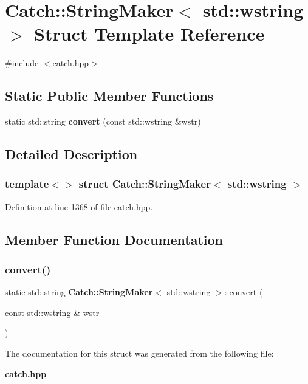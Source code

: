 \section{Catch\+::String\+Maker$<$ std\+::wstring $>$ Struct Template Reference}
\label{struct_catch_1_1_string_maker_3_01std_1_1wstring_01_4}


{\ttfamily \#include $<$catch.\+hpp$>$}

\subsection*{Static Public Member Functions}
\begin{DoxyCompactItemize}
\item 
static std\+::string \textbf{ convert} (const std\+::wstring \&wstr)
\end{DoxyCompactItemize}


\subsection{Detailed Description}
\subsubsection*{template$<$$>$\newline
struct Catch\+::\+String\+Maker$<$ std\+::wstring $>$}



Definition at line 1368 of file catch.\+hpp.



\subsection{Member Function Documentation}
\mbox{\label{struct_catch_1_1_string_maker_3_01std_1_1wstring_01_4_a375d49d6281bee4d36d853fa1bd5ebbd}} 
\subsubsection{convert()}
{\footnotesize\ttfamily static std\+::string \textbf{ Catch\+::\+String\+Maker}$<$ std\+::wstring $>$\+::convert (\begin{DoxyParamCaption}\item[{const std\+::wstring \&}]{wstr }\end{DoxyParamCaption})\hspace{0.3cm}{\ttfamily [static]}}



The documentation for this struct was generated from the following file\+:\begin{DoxyCompactItemize}
\item 
\textbf{ catch.\+hpp}\end{DoxyCompactItemize}
